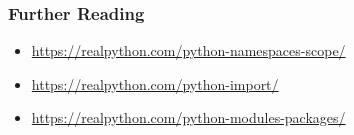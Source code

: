 \documentclass[10pt]{beamer}
\begin{document}
\begin{frame}
  \frametitle{Further Reading}
  
  \begin{itemize}
    \item \url{https://realpython.com/python-namespaces-scope/}
    \item \url{https://realpython.com/python-import/}
    \item \url{https://realpython.com/python-modules-packages/}
  \end{itemize}  
  
\end{frame}
\end{document}
